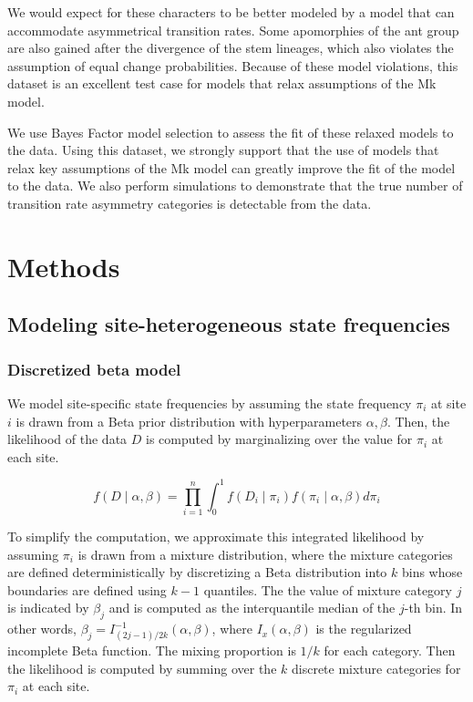 \documentclass[]{article}
\begin{document}
We would expect for these characters to be better modeled by a model that can accommodate asymmetrical transition rates.
Some apomorphies of the ant group are also gained after the divergence of the stem lineages, which also violates the assumption of equal change probabilities.
Because of these model violations, this dataset is an excellent test case for models that relax assumptions of the Mk model. \par
We use Bayes Factor model selection to assess the fit of these relaxed models to the data.
Using this dataset, we strongly support that the use of models that relax key assumptions of the Mk model can greatly improve the fit of the model to the data.
We also perform simulations to demonstrate that the true number of transition rate asymmetry categories is detectable from the data.

\section{Methods}

\subsection{Modeling site-heterogeneous state frequencies}

\subsubsection{Discretized beta model}
We model site-specific state frequencies by assuming the state frequency $\pi_i$ at site $i$ is drawn from a Beta prior distribution with hyperparameters $\alpha,\beta$.
Then, the likelihood of the data $D$ is computed by marginalizing over the value for $\pi_i$ at each site.

\begin{equation}\label{continuous-likelihood}
f(D\mid \alpha,\beta) = \prod_{i=1}^n\int_0^1 f(D_i \mid \pi_i)f(\pi_i \mid \alpha,\beta)d\pi_i
\end{equation}

To simplify the computation, we approximate this integrated likelihood by assuming $\pi_i$ is drawn from a mixture distribution, where the mixture categories are defined deterministically by discretizing a Beta distribution into $k$ bins whose boundaries are defined using $k-1$ quantiles.
The the value of mixture category $j$ is indicated by $\beta_j$ and is computed as the interquantile median of the $j$-th bin.
In other words, $\beta_j = I^{-1}_{(2j-1)/2k}(\alpha,\beta)$, where $I_x(\alpha,\beta)$ is the regularized incomplete Beta function.
The mixing proportion is $1/k$ for each category.
Then the likelihood is computed by summing over the $k$ discrete mixture categories for $\pi_i$ at each site.
\end{document}
